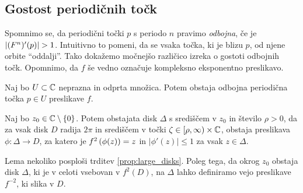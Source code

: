 \subsection{Gostost periodičnih točk}

Spomnimo se, da periodični točki \(p\) s periodo \(n\) pravimo \emph{odbojna}, če je \(\left\lvert(F^n)' (p)\right\rvert > 1\). Intuitivno to pomeni, da se vsaka točka, ki je blizu \(p\), od njene orbite ``oddalji''. Tako dokažemo močnejšo različico izreka o gostoti odbojnih točk. Opomnimo, da \(f\) še vedno označuje kompleksno eksponentno preslikavo.

\begin{izrek} \label{thm:periodicdense}
    Naj bo \(U \subset \mathbb C\) neprazna in odprta množica. Potem obstaja odbojna periodična točka \(p \in U\) preslikave \(f\).
\end{izrek}

\begin{lema} \label{lem:inversebranches}
    Naj bo \(z_0 \in \mathbb C \setminus \left\{ 0 \right\}\). Potem obstajata disk \(\Delta\) s središčem v \(z_0\) in število \(\rho > 0\), da za vsak disk \(D\) radija \(2 \pi\) in središčem v točki \(\zeta \in [\rho, \infty) \times \mathbb C\), obstaja preslikava \(\phi \colon \Delta \to D\), za katero je \(f^2 \left( \phi (z) \right) = z\) in \(|\phi' (z)| \leq 1\) za vsak \(z \in \Delta\).
\end{lema}

\noindent Lema nekoliko posploši trditev \ref{prop:large_disks}. Poleg tega, da okrog \(z_0\) obstaja disk \(\Delta\), ki je v celoti vsebovan v \(f^2 (D)\), na \(\Delta\) lahko definiramo vejo preslikave \(f^{-2}\), ki slika v \(D\).

